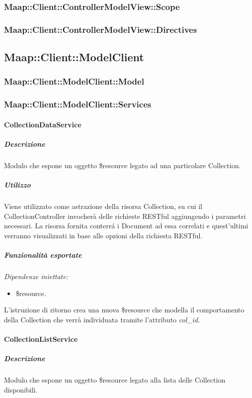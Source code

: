 \subsubsection{Maap::Client::ControllerModelView::Scope}

\subsubsection{Maap::Client::ControllerModelView::Directives}

\subsection{Maap::Client::ModelClient}

\subsubsection{Maap::Client::ModelClient::Model}

\subsubsection{Maap::Client::ModelClient::Services}

\paragraph{CollectionDataService}
\subparagraph{Descrizione}
Modulo che espone un oggetto \$resource legato ad una particolare Collection. 

\subparagraph{Utilizzo}
Viene utilizzato come astrazione della risorsa Collection, su cui il CollectionController invocherà delle richieste  RESTful aggiungendo i parametri necessari. La risorsa fornita conterr\'{a} i Document ad essa correlati e quest'ultimi verranno visualizzati in base alle opzioni della richiesta RESTful.

\subparagraph{Funzionalità esportate}
\emph{Dipendenze iniettate:}
\begin{itemize}
 \item \$resource.
\end{itemize}
L'istruzione di ritorno crea una nuova \$resource che modella il comportamento della Collection che verrà individuata tramite l'attributo \emph{col\_id}.


\paragraph{CollectionListService}
\subparagraph{Descrizione}
Modulo che espone un oggetto \$resource legato alla lista delle Collection disponibili. 

